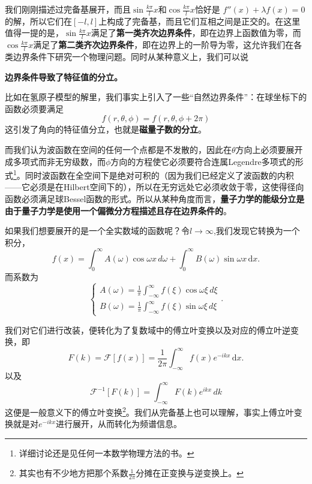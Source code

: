 \documentclass[12pt,a4paper,openany,twoside]{book}
\numberwithin{equation}{section}
\newcommand{\ud}{\mathrm{d}}
\begin{document}
        我们刚刚描述过完备基展开，而且$\sin{\frac{k \pi}{l} x}$和$\cos{\frac{k \pi}{l} x}$恰好是 $f''(x) + \lambda f(x) = 0$的解，所以它们在$[-l,l]$上构成了完备基，而且它们互相之间是正交的。在这里值得一提的是，$\sin{\frac{k \pi}{l} x}$满足了\textbf{第一类齐次边界条件}，即在边界上函数值为零，而$\cos{\frac{k \pi}{l} x}$满足了\textbf{第二类齐次边界条件}，即在边界上的一阶导为零，这允许我们在各类边界条件下研究一个物理问题。同时从某种意义上，我们可以说
        \begin{center}
          \textbf{边界条件导致了特征值的分立。}
        \end{center}
        比如在氢原子模型的解里，我们事实上引入了一些“自然边界条件”：在球坐标下的函数必须要满足
        \begin{equation}
          f(r,\theta, \phi) = f(r,\theta, \phi + 2\pi)
        \end{equation}
        这引发了角向的特征值分立，也就是\textbf{磁量子数的分立}。

        而我们认为波函数在空间的任何一个点都是不发散的，因此在$\theta$方向上必须要展开成多项式而非无穷级数，而$\phi$方向的方程使它必须要符合连属Legendre多项式的形式\footnote{详细讨论还是见任何一本数学物理方法的书。}。同时波函数在全空间下是绝对可积的（因为我们已经定义了波函数的内积——它必须是在Hilbert空间下的），所以在无穷远处它必须收敛于零，这使得径向函数必须满足球Bessel函数的形式。所以从某种角度而言，\textbf{量子力学的能级分立是由于量子力学是使用一个偏微分方程描述且存在边界条件的}。

        如果我们想要展开的是一个全实数域的函数呢？令$l \to \infty$,我们发现它转换为一个积分，
        \begin{equation}
          f(x) = \int _0 ^\infty A(\omega) \cos{\omega x} \, d\omega + \int _0 ^\infty B(\omega) \sin{\omega x} \, \ud x  
          .
        \end{equation}
        而系数为
        \begin{equation}
          \begin{cases}
            A(\omega) = \frac{1}{\pi} \int ^\infty _{-\infty} f(\xi) \cos{\omega \xi} \, d\xi \\
            B(\omega) = \frac{1}{\pi} \int ^\infty _{-\infty} f(\xi) \sin{\omega \xi}\, d\xi 
          \end{cases}
          .
        \end{equation}

        我们对它们进行改装，便转化为了复数域中的傅立叶变换以及对应的傅立叶逆变换，即
        \begin{equation}
          F(k) =  \mathcal{F} [f(x)] = \frac{1}{2\pi}\int_{-\infty}^{\infty} f(x) e^{-ikx} \, \ud x 
          .
        \end{equation}
        以及
        \begin{equation}
          \mathcal{F}^{-1} [F(k)] = \int_{-\infty} ^\infty F(k) e^{ikx} \, dk
        \end{equation}
        这便是一般意义下的傅立叶变换\footnote{其实也有不少地方把那个系数$\frac{1}{2\pi}$分摊在正变换与逆变换上。}。我们从完备基上也可以理解，事实上傅立叶变换就是对$e^{-ikx}$进行展开，从而转化为频谱信息。
\end{document}
